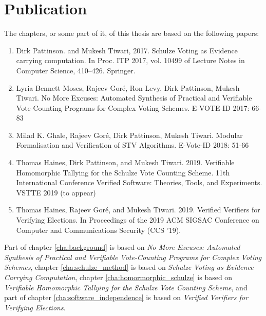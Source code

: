 \section{Publication}
 The chapters, or some part of it,  of this thesis are based on the following papers:
	\begin{enumerate}
	\item Dirk Pattinson. and Mukesh Tiwari, 2017. Schulze Voting as Evidence carrying computation. In Proc. 
	ITP 2017, vol. 10499 of Lecture Notes in Computer Science, 410–426. Springer. 
	\item Lyria Bennett Moses, Rajeev Goré, Ron Levy, Dirk Pattinson, Mukesh Tiwari.
	No More Excuses: Automated Synthesis of Practical and Verifiable Vote-Counting Programs for Complex 
	Voting 	Schemes. E-VOTE-ID 2017: 66-83
	\item Milad K. Ghale, Rajeev Goré, Dirk Pattinson, Mukesh Tiwari.
	Modular Formalisation and Verification of STV Algorithms. E-Vote-ID 2018: 51-66
	\item Thomas Haines, Dirk Pattinson, and Mukesh Tiwari. 2019. 
	  Verifiable Homomorphic Tallying for the Schulze Vote Counting Scheme. 
	  11th International Conference Verified Software: Theories, Tools, and Experiments. 
      VSTTE 2019 (to appear)	  
	\item Thomas Haines, Rajeev Goré, and Mukesh Tiwari. 2019. Verified Verifiers for Verifying Elections. 
	 In Proceedings of the 2019 ACM SIGSAC Conference on Computer and Communications Security (CCS '19).
	\end{enumerate}
 \noindent
 Part of chapter \ref{cha:background} is based on \textit{No More Excuses: Automated Synthesis of Practical 
 and Verifiable Vote-Counting Programs for Complex Voting  Schemes},
 chapter \ref{cha:schulze_method} is based on \textit{Schulze Voting as Evidence Carrying Computation},
 chapter \ref{cha:homormorphic_schulze} is based on \textit{Verifiable Homomorphic Tallying for the 
 Schulze Vote Counting Scheme}, and part of chapter
 \ref{cha:software_independence} is based on \textit{Verified Verifiers for Verifying Elections}.




